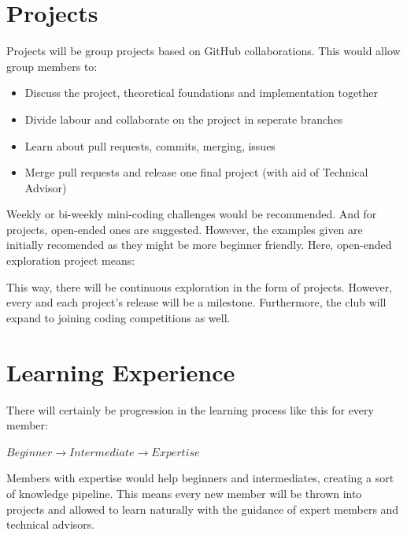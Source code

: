 \documentclass{article}
\begin{document}
\section{Projects}
Projects will be group projects based on GitHub collaborations. This would allow group members to:
\begin{itemize}
\item Discuss the project, theoretical foundations and implementation together
\item Divide labour and collaborate on the project in seperate branches
\item Learn about pull requests, commits, merging, issues
\item Merge pull requests and release one final project (with aid of Technical Advisor)

\end{itemize}

Weekly or bi-weekly mini-coding challenges would be recommended. And for projects, open-ended ones are suggested. However, the examples given are initially recomended as they might be more beginner friendly. Here, open-ended exploration project means:

\vspace{0.5cm}

\vspace{0.5cm}
This way, there will be continuous exploration in the form of projects. However, every and each project's release will be a milestone. Furthermore, the club will expand to joining coding competitions as well.

\section{Learning Experience}

There will certainly be progression in the learning process like this for every member:

\begin{math}
Beginner \to Intermediate \to Expertise
\end{math}

\vspace{0.5cm}

Members with expertise would help beginners and intermediates, creating a sort of knowledge pipeline. This means every new member will be thrown into projects and allowed to learn naturally with the guidance of expert members and technical advisors. 
\end{document}
